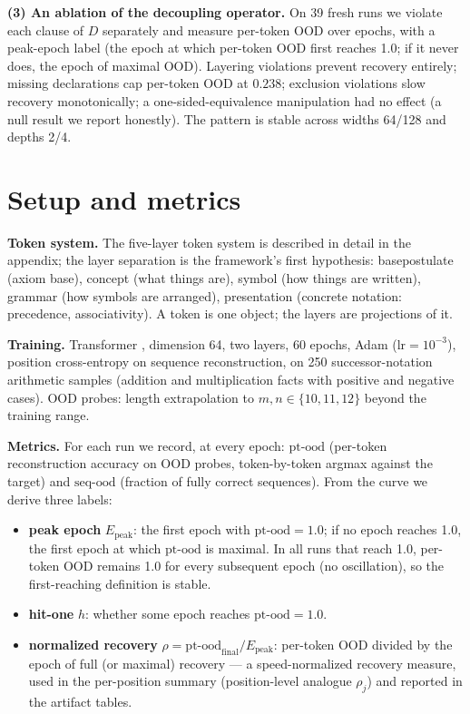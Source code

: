 \documentclass{article} %
\begin{document}
\textbf{(3) An ablation of the decoupling operator.} On 39 fresh
runs we violate each clause of $D$ separately and measure per-token
OOD over epochs, with a peak-epoch label (the epoch at which
per-token OOD first reaches 1.0; if it never does, the epoch of
maximal OOD). Layering violations prevent recovery entirely;
missing declarations cap per-token OOD at $0.238$; exclusion
violations slow recovery monotonically; a one-sided-equivalence
manipulation had no effect (a null result we report honestly). The
pattern is stable across widths 64/128 and depths 2/4.

\section{Setup and metrics}

\textbf{Token system.} The five-layer token system is described in
detail in the appendix; the layer separation is the framework's
first hypothesis: basepostulate (axiom base), concept (what things
are), symbol (how things are written), grammar (how symbols are
arranged), presentation (concrete notation: precedence,
associativity). A token is one object; the layers are projections
of it.

\textbf{Training.} Transformer \citep{vaswani2017attention}, dimension
64, two layers, 60 epochs, Adam ($\mathrm{lr}=10^{-3}$), position
cross-entropy on sequence reconstruction, on 250 successor-notation
arithmetic samples (addition and multiplication facts with positive
and negative cases). OOD probes: length extrapolation to
$m,n \in \{10,11,12\}$ beyond the training range.

\textbf{Metrics.} For each run we record, at every epoch:
$\mathrm{pt\text{-}ood}$ (per-token reconstruction accuracy on OOD
probes, token-by-token argmax against the target) and
$\mathrm{seq\text{-}ood}$ (fraction of fully correct sequences).
From the curve we derive three labels:
\begin{itemize}
\item \textbf{peak epoch} $E_\mathrm{peak}$: the first epoch with
$\mathrm{pt\text{-}ood}=1.0$; if no epoch reaches 1.0, the first
epoch at which $\mathrm{pt\text{-}ood}$ is maximal. In all runs
that reach 1.0, per-token OOD remains 1.0 for every subsequent
epoch (no oscillation), so the first-reaching definition is stable.
\item \textbf{hit-one} $h$: whether some epoch reaches
$\mathrm{pt\text{-}ood}=1.0$.
\item \textbf{normalized recovery} $\rho = \mathrm{pt\text{-}ood}_\mathrm{final} / E_\mathrm{peak}$:
per-token OOD divided by the epoch of full (or maximal) recovery ---
a speed-normalized recovery measure, used in the per-position
summary (position-level analogue $\rho_j$) and reported in the
artifact tables.
\end{itemize}
\end{document}
